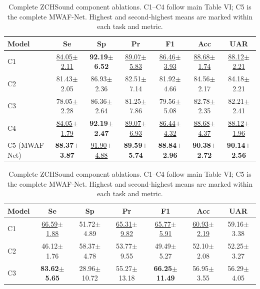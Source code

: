 \begin{table}[H]
\centering\color{black}
\caption{Complete ZCHSound component ablations. C1--C4 follow main Table VI; C5 is the complete MWAF-Net. Highest and second-highest means are marked within each task and metric.}\label{tab:supp_components}
\label{tab:supp_original_ablation_binary}
\label{tab:supp_original_ablation_five}
\begingroup
\fontsize{8.5}{10}\selectfont
\setlength{\tabcolsep}{6pt}\renewcommand{\arraystretch}{1.04}
\begin{tabular*}{\linewidth}{@{\extracolsep{\fill}}lcccccc@{}}\toprule
\textbf{Model} & \textbf{Se} & \textbf{Sp} & \textbf{Pr} & \textbf{F1} & \textbf{Acc} & \textbf{UAR}\\\midrule
C1 & \underline{84.05$\pm$2.11} & \textbf{92.19$\pm$6.52} & \underline{89.07$\pm$5.83} & \underline{86.46$\pm$3.93} & \underline{88.68$\pm$1.74} & \underline{88.12$\pm$2.21}\\
C2 & 81.43$\pm$2.05 & 86.93$\pm$2.36 & 82.51$\pm$7.14 & 81.92$\pm$4.66 & 84.56$\pm$2.17 & 84.18$\pm$2.21\\
C3 & 78.05$\pm$2.28 & 86.36$\pm$2.64 & 81.25$\pm$7.86 & 79.56$\pm$5.08 & 82.78$\pm$2.35 & 82.21$\pm$2.41\\
C4 & \underline{84.05$\pm$1.79} & \textbf{92.19$\pm$2.47} & \underline{89.07$\pm$6.93} & \underline{86.44$\pm$4.32} & \underline{88.68$\pm$4.37} & \underline{88.12$\pm$1.96}\\
C5 (MWAF-Net) & \textbf{88.37$\pm$3.87} & \underline{91.90$\pm$4.88} & \textbf{89.59$\pm$5.74} & \textbf{88.84$\pm$2.96} & \textbf{90.38$\pm$2.72} & \textbf{90.14$\pm$2.56}\\
\bottomrule\end{tabular*}
\endgroup
{}
\begingroup
\fontsize{8.5}{10}\selectfont
\setlength{\tabcolsep}{6pt}\renewcommand{\arraystretch}{1.04}
\begin{tabular*}{\linewidth}{@{\extracolsep{\fill}}lcccccc@{}}\toprule
\textbf{Model} & \textbf{Se} & \textbf{Sp} & \textbf{Pr} & \textbf{F1} & \textbf{Acc} & \textbf{UAR}\\\midrule
C1 & \underline{66.59$\pm$1.88} & 51.72$\pm$4.89 & \underline{65.31$\pm$9.82} & \underline{65.77$\pm$5.91} & \underline{60.93$\pm$2.19} & 59.16$\pm$3.38\\
C2 & 46.12$\pm$1.76 & 58.37$\pm$4.78 & 53.77$\pm$9.55 & 49.49$\pm$5.27 & 52.10$\pm$2.08 & 52.25$\pm$3.27\\
C3 & \textbf{83.62$\pm$5.65} & 28.96$\pm$10.72 & 55.27$\pm$13.18 & \textbf{66.25$\pm$11.49} & 56.95$\pm$3.55 & 56.29$\pm$4.05\\

\end{tabular*}
\end{table}
